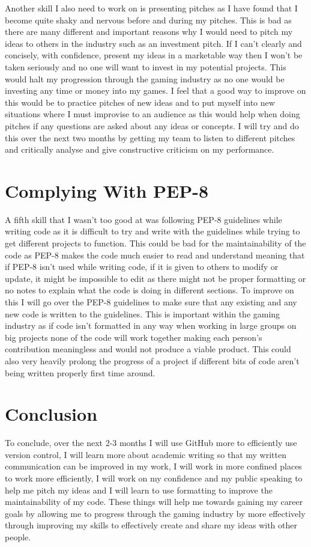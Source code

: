 \documentclass{scrartcl}
\begin{document}
Another skill I also need to work on is presenting pitches as I have found that I become quite shaky and nervous before and during my pitches. This is bad as there are many different and important reasons why I would need to pitch my ideas to others in the industry such as an investment pitch. If I can’t clearly and concisely, with confidence, present my ideas in a marketable way then I won’t be taken seriously and no one will want to invest in my potential projects. This would halt my progression through the gaming industry as no one would be investing any time or money into my games. I feel that a good way to improve on this would be to practice pitches of new ideas and to put myself into new situations where I must improvise to an audience as this would help when doing pitches if any questions are asked about any ideas or concepts. I will try and do this over the next two months by getting my team to listen to different pitches and critically analyse and give constructive criticism on my performance.

\section{Complying With PEP-8}

A fifth skill that I wasn’t too good at was following PEP-8 guidelines while writing code as it is difficult to try and write with the guidelines while trying to get different projects to function. This could be bad for the maintainability of the code as PEP-8 makes the code much easier to read and understand meaning that if PEP-8 isn’t used while writing code, if it is given to others to modify or update, it might be impossible to edit as there might not be proper formatting or no notes to explain what the code is doing in different sections. To improve on this I will go over the PEP-8 guidelines to make sure that any existing and any new code is written to the guidelines. This is important within the gaming industry as if code isn’t formatted in any way when working in large groups on big projects none of the code will work together making each person’s contribution meaningless and would not produce a viable product. This could also very heavily prolong the progress of a project if different bits of code aren’t being written properly first time around.

\section{Conclusion}

To conclude, over the next 2-3 months I will use GitHub more to efficiently use version control, I will learn more about academic writing so that my written communication can be improved in my work, I will work in more confined places to work more efficiently, I will work on my confidence and my public speaking to help me pitch my ideas and I will learn to use formatting to improve the maintainability of my code. These things will help me towards gaining my career goals by allowing me to progress through the gaming industry by more effectively through improving my skills to effectively create and share my ideas with other people.



\end{document}

